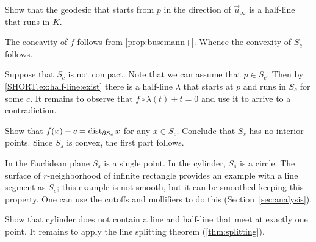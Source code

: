Show that the geodesic that starts from $p$ in the direction of $\vec u_\infty$ is a half-line that runs in $K$.

 The concavity of $f$ follows from \ref{prop:busemann+}.
Whence the convexity of $S_c$ follows.

Suppose that $S_c$ is not compact.
Note that we can assume that $p\in S_c$.
Then by \ref{SHORT.ex:half-line:exist} there is a half-line $\lambda$ that starts at $p$ and runs in $S_c$ for some $c$.
It remains to observe that $f\circ\lambda(t)+t=0$ and use it to arrive to a contradiction.

Show that 
$f(x)-c=\mathop{\rm dist}\nolimits_{\partial S_c}x$
for any $x\in S_c$.
Conclude that $S_s$ has no interior points.
Since $S_s$ is convex, the first part follows.

In the Euclidean plane $S_s$ is a single point.
In the cylinder, $S_s$ is a circle.
The surface of $r$-neighborhood of infinite rectangle provides an example with a line segment as $S_s$; this example is not smooth, but it can be smoothed keeping this property.
One can use the cutoffs and mollifiers to do this (Section~\ref{sec:analysis}).


Show that cylinder does not contain a line and half-line that meet at exactly one point.
It remains to apply the line splitting theorem (\ref{thm:splitting}).


